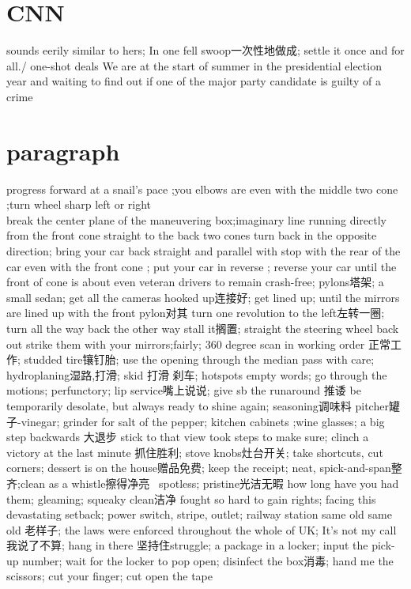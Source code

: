 \documentclass[a4paper,12pt]{article}
\begin{document}
\section{CNN}
sounds eerily similar to hers;
In one fell swoop一次性地做成; settle it once and for all./ one-shot deals
We are at the start of summer in the presidential election year and waiting to find out if one of the major party candidate is guilty of a crime 
\section{paragraph}
progress forward at a snail's pace ;you elbows are even with the middle two cone ;turn wheel sharp left or right
\\break the center plane of the maneuvering box;imaginary line running directly from the front cone straight to the back two cones
turn back in the opposite direction; bring your car back straight and parallel with
stop with the rear of the car even with the front cone ; put your car in reverse ; reverse your car until the front of cone is about even
veteran drivers to remain crash-free; pylons塔架; a small sedan; get all the cameras hooked up连接好;
get lined up; until the mirrors are lined up with the front pylon对其
turn one revolution to the left左转一圈; turn all the way back the other way
stall it搁置; straight the steering wheel back out
strike them with your mirrors;fairly; 360 degree scan
in working order 正常工作; studded tire镶钉胎; use the opening through the median
pass with care; hydroplaning湿路,打滑; skid 打滑 刹车; hotspots
empty words; go through the motions; perfunctory; lip service嘴上说说; give sb the runaround 推诿
be temporarily desolate, but always ready to shine again; 
seasoning调味料 pitcher罐子-vinegar; grinder for salt of the pepper; kitchen cabinets ;wine glasses; a big step backwards 大退步 stick to that view
took steps to make sure; clinch a victory at the last minute 抓住胜利; stove knobs灶台开关; take shortcuts, cut corners; dessert is on the house赠品免费; keep the receipt; neat, spick-and-span整齐;clean as a whistle擦得净亮 
spotless; pristine光洁无暇 how long have you had them; gleaming; squeaky clean洁净
fought so hard to gain rights; facing this devastating setback; power switch, stripe, outlet; railway station
same old same old 老样子;
the laws were enforced throughout the whole of UK; It's not my call我说了不算; hang in there 坚持住struggle;
a package in a locker; input the pick-up number; wait for the locker to pop open; disinfect the box消毒; hand me the scissors; cut your finger; cut open the tape
\end{document}
